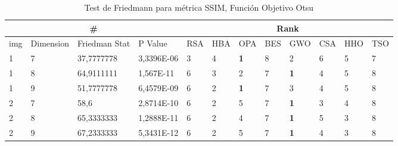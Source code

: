 \documentclass[conference]{IEEEtran}
\begin{document}
\begin{table}[]
	\centering
	\caption{Test de Friedmann para métrica SSIM, Función Objetivo Otsu}
	\begin{tabular}{|llll|llllllll|}
		\hline
		\multicolumn{4}{|c|}{\#} & \multicolumn{8}{c|}{Rank} \\ \hline
		\multicolumn{1}{|l|}{img} & \multicolumn{1}{l|}{Dimension} & \multicolumn{1}{l|}{Friedman Stat} & P Value & \multicolumn{1}{l|}{RSA} & \multicolumn{1}{l|}{HBA} & \multicolumn{1}{l|}{OPA} & \multicolumn{1}{l|}{BES} & \multicolumn{1}{l|}{GWO} & \multicolumn{1}{l|}{CSA} & \multicolumn{1}{l|}{HHO} & TSO \\ \hline
		\multicolumn{1}{|l|}{1} & \multicolumn{1}{l|}{7} & \multicolumn{1}{l|}{37,7777778} & 3,3396E-06 & \multicolumn{1}{l|}{3} & \multicolumn{1}{l|}{4} & \multicolumn{1}{l|}{\textbf{1}} & \multicolumn{1}{l|}{8} & \multicolumn{1}{l|}{2} & \multicolumn{1}{l|}{6} & \multicolumn{1}{l|}{5} & 7 \\ \hline
		\multicolumn{1}{|l|}{1} & \multicolumn{1}{l|}{8} & \multicolumn{1}{l|}{64,9111111} & 1,567E-11 & \multicolumn{1}{l|}{6} & \multicolumn{1}{l|}{3} & \multicolumn{1}{l|}{2} & \multicolumn{1}{l|}{7} & \multicolumn{1}{l|}{\textbf{1}} & \multicolumn{1}{l|}{4} & \multicolumn{1}{l|}{5} & 8 \\ \hline
		\multicolumn{1}{|l|}{1} & \multicolumn{1}{l|}{9} & \multicolumn{1}{l|}{51,7777778} & 6,4579E-09 & \multicolumn{1}{l|}{6} & \multicolumn{1}{l|}{2} & \multicolumn{1}{l|}{\textbf{1}} & \multicolumn{1}{l|}{7} & \multicolumn{1}{l|}{3} & \multicolumn{1}{l|}{4} & \multicolumn{1}{l|}{5} & 8 \\ \hline
		\multicolumn{1}{|l|}{2} & \multicolumn{1}{l|}{7} & \multicolumn{1}{l|}{58,6} & 2,8714E-10 & \multicolumn{1}{l|}{6} & \multicolumn{1}{l|}{2} & \multicolumn{1}{l|}{5} & \multicolumn{1}{l|}{7} & \multicolumn{1}{l|}{\textbf{1}} & \multicolumn{1}{l|}{3} & \multicolumn{1}{l|}{4} & 8 \\ \hline
		\multicolumn{1}{|l|}{2} & \multicolumn{1}{l|}{8} & \multicolumn{1}{l|}{65,3333333} & 1,2888E-11 & \multicolumn{1}{l|}{6} & \multicolumn{1}{l|}{2} & \multicolumn{1}{l|}{4} & \multicolumn{1}{l|}{7} & \multicolumn{1}{l|}{\textbf{1}} & \multicolumn{1}{l|}{5} & \multicolumn{1}{l|}{3} & 8 \\ \hline
		\multicolumn{1}{|l|}{2} & \multicolumn{1}{l|}{9} & \multicolumn{1}{l|}{67,2333333} & 5,3431E-12 & \multicolumn{1}{l|}{6} & \multicolumn{1}{l|}{2} & \multicolumn{1}{l|}{5} & \multicolumn{1}{l|}{7} & \multicolumn{1}{l|}{\textbf{1}} & \multicolumn{1}{l|}{4} & \multicolumn{1}{l|}{3} & 8 \\ \hline

\end{tabular}
\end{table}
\end{document}
